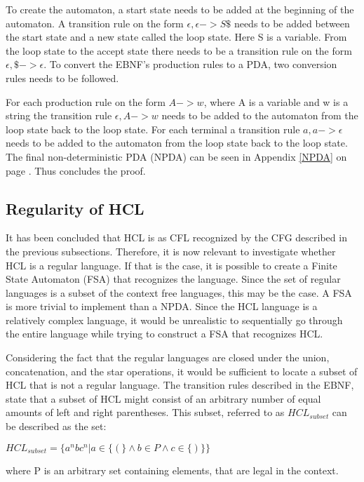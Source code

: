 To create the automaton, a start state needs to be added at the beginning of the automaton. 
A transition rule on the form $\epsilon,\epsilon->S\$$ needs to be added between the start state and a new state called the loop state.
Here S is a variable.
From the loop state to the accept state there needs to be a transition rule on the form $\epsilon,\$->\epsilon$.
To convert the EBNF's production rules to a PDA, two conversion rules needs to be followed.

For each production rule on the form $A->w$, where A is a variable and w is a string the transition rule $\epsilon,A->w$ needs to be added to the automaton from the loop state back to the loop state.
For each terminal a transition rule $a,a->\epsilon$ needs to be added to the automaton from the loop state back to the loop state.
The final non-deterministic PDA (NPDA) can be seen in Appendix \ref{NPDA} on page \pageref{NPDA}.
Thus concludes the proof.

\subsection{Regularity of HCL}
It has been concluded that HCL is as CFL recognized by the CFG described in the previous subsections.
Therefore, it is now relevant to investigate whether HCL is a regular language. 
If that is the case, it is possible to create a Finite State Automaton (FSA) that recognizes the language. 
Since the set of regular languages is a subset of the context free languages, this may be the case.
A FSA is more trivial to implement than a NPDA. 
Since the HCL language is a relatively complex language, it would be unrealistic to sequentially go through the entire language while trying to construct a FSA that recognizes HCL.

Considering the fact that the regular languages are closed under the union, concatenation, and the star operations, it would be sufficient to locate a subset of HCL that is not a regular language.
The transition rules described in the EBNF, state that a subset of HCL might consist of an arbitrary number of equal amounts of left and right parentheses.
This subset, referred to as $HCL_{subset}$ can be described as the set:
\begin{center}
	$HCL_{subset} = \{a^nbc^n | a \in \{(\} \wedge b \in P \wedge c \in \{)\}\}$
\end{center}

where P is an arbitrary set containing elements, that are legal in the context.

